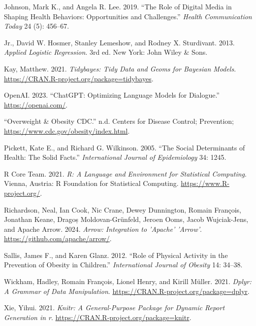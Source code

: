 \documentclass[
  letterpaper,
  DIV=11,
  numbers=noendperiod]{scrartcl}
\newlength{\cslhangindent}
\newlength{\cslentryspacingunit} %
\newenvironment{CSLReferences}[2] %
 {%
  \setlength{\parindent}{0pt}
  \ifodd #1
  \let\oldpar\par
  \def\par{\hangindent=\cslhangindent\oldpar}
  \fi
  \setlength{\parskip}{#2\cslentryspacingunit}
 }%
 {}
\begin{document}
\begin{CSLReferences}{1}{0}
\leavevmode{}%
Johnson, Mark K., and Angela R. Lee. 2019. {``The Role of Digital Media
in Shaping Health Behaviors: Opportunities and Challenges.''}
\emph{Health Communication Today} 24 (5): 456--67.

\leavevmode{}%
Jr., David W. Hosmer, Stanley Lemeshow, and Rodney X. Sturdivant. 2013.
\emph{Applied Logistic Regression}. 3rd ed. New York: John Wiley \&
Sons.

\leavevmode{}%
Kay, Matthew. 2021. \emph{Tidybayes: Tidy Data and Geoms for Bayesian
Models}. \url{https://CRAN.R-project.org/package=tidybayes}.

\leavevmode{}%
OpenAI. 2023. {``ChatGPT: Optimizing Language Models for Dialogue.''}
\url{https://openai.com/}.

\leavevmode{}%
{``Overweight \& Obesity \textbar{} CDC.''} n.d. Centers for Disease
Control; Prevention; \url{https://www.cdc.gov/obesity/index.html}.

\leavevmode{}%
Pickett, Kate E., and Richard G. Wilkinson. 2005. {``The Social
Determinants of Health: The Solid Facts.''} \emph{International Journal
of Epidemiology} 34: 1245.

\leavevmode{}%
R Core Team. 2021. \emph{R: A Language and Environment for Statistical
Computing}. Vienna, Austria: R Foundation for Statistical Computing.
\url{https://www.R-project.org/}.

\leavevmode{}%
Richardson, Neal, Ian Cook, Nic Crane, Dewey Dunnington, Romain
François, Jonathan Keane, Dragoș Moldovan-Grünfeld, Jeroen Ooms, Jacob
Wujciak-Jens, and Apache Arrow. 2024. \emph{Arrow: Integration to
'Apache' 'Arrow'}. \url{https://github.com/apache/arrow/}.

\leavevmode{}%
Sallis, James F., and Karen Glanz. 2012. {``Role of Physical Activity in
the Prevention of Obesity in Children.''} \emph{International Journal of
Obesity} 14: 34--38.

\leavevmode{}%
Wickham, Hadley, Romain François, Lionel Henry, and Kirill Müller. 2021.
\emph{Dplyr: A Grammar of Data Manipulation}.
\url{https://CRAN.R-project.org/package=dplyr}.

\leavevmode{}%
Xie, Yihui. 2021. \emph{Knitr: A General-Purpose Package for Dynamic
Report Generation in r}. \url{https://CRAN.R-project.org/package=knitr}.

\end{CSLReferences}
\end{document}
